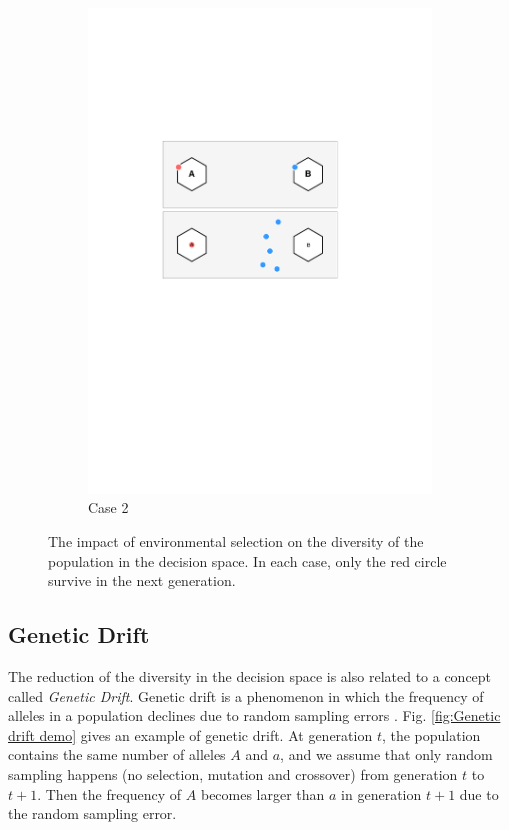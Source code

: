 \documentclass[conference]{IEEEtran}
\begin{document}
\begin{figure}[htbp]
\begin{subfigure}[b]{.24\textwidth}
		\includegraphics[width=\linewidth]{Section3/case2}
		\caption{Case 2}
	\end{subfigure}
	\caption{The impact of environmental selection on the diversity of the population in the decision space. In each case, only the red circle survive in the next generation.}
	\label{fig: Environmental selection}
\end{figure}


\subsection{Genetic Drift}
The reduction of the diversity in the decision space is also related to a concept called \textit{Genetic Drift}. Genetic drift is a phenomenon in which the frequency of alleles in a population declines due to random sampling errors \cite{muhlenbein1993predictive}. Fig. \ref{fig:Genetic drift demo} gives an example of genetic drift. At generation $t$, the population contains the same number of alleles $A$ and $a$, and we assume that only random sampling happens (no selection, mutation and crossover) from generation $t$ to $t+1$. Then the frequency of $A$ becomes larger than $a$ in generation $t+1$ due to the random sampling error. 
\end{document}
